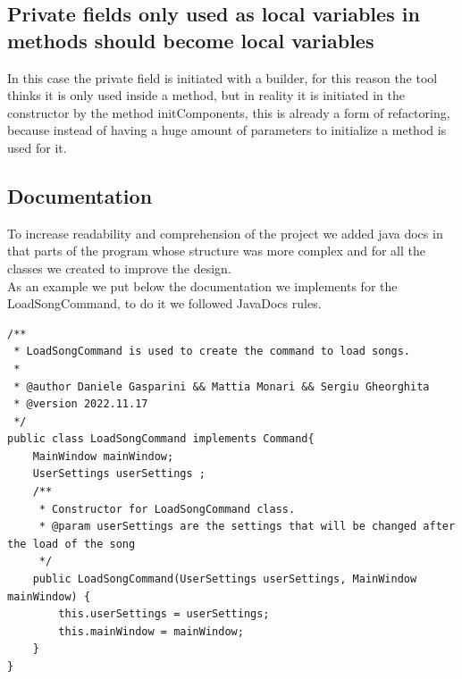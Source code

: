 \documentclass{article}
\begin{document}
\subsection{Private fields only used as local variables in methods should become local variables}

In this case the private field is initiated with a builder, for this reason the tool thinks it is only used inside a method, but in reality it is initiated in the constructor by the method initComponents, this is already a form of refactoring, because instead of having a huge amount of parameters to initialize a method is used for it.

\subsection{Documentation}
To increase readability and comprehension of the project we added java docs in that parts of the program whose structure was more complex and for all the classes we created to improve the design.\\
As an example we put below the documentation we implements for the LoadSongCommand, to do it we followed JavaDocs rules.

\begin{lstlisting}[caption={Adding JavaDocs},captionpos=b]
/**
 * LoadSongCommand is used to create the command to load songs.
 *
 * @author Daniele Gasparini && Mattia Monari && Sergiu Gheorghita
 * @version 2022.11.17
 */
public class LoadSongCommand implements Command{
    MainWindow mainWindow;
    UserSettings userSettings ;
    /**
     * Constructor for LoadSongCommand class.
     * @param userSettings are the settings that will be changed after the load of the song
     */
    public LoadSongCommand(UserSettings userSettings, MainWindow mainWindow) {
        this.userSettings = userSettings;
        this.mainWindow = mainWindow;
    }
}
\end{lstlisting}

\end{document}
